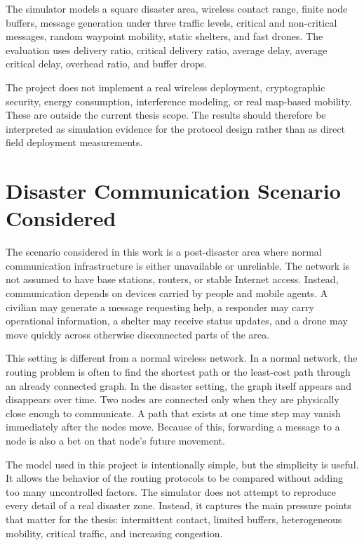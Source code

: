 The simulator models a square disaster area, wireless contact range, finite node buffers, message generation under three traffic levels, critical and non-critical messages, random waypoint mobility, static shelters, and fast drones. The evaluation uses delivery ratio, critical delivery ratio, average delay, average critical delay, overhead ratio, and buffer drops.

The project does not implement a real wireless deployment, cryptographic security, energy consumption, interference modeling, or real map-based mobility. These are outside the current thesis scope. The results should therefore be interpreted as simulation evidence for the protocol design rather than as direct field deployment measurements.

\section{Disaster Communication Scenario Considered}
The scenario considered in this work is a post-disaster area where normal communication infrastructure is either unavailable or unreliable. The network is not assumed to have base stations, routers, or stable Internet access. Instead, communication depends on devices carried by people and mobile agents. A civilian may generate a message requesting help, a responder may carry operational information, a shelter may receive status updates, and a drone may move quickly across otherwise disconnected parts of the area.

This setting is different from a normal wireless network. In a normal network, the routing problem is often to find the shortest path or the least-cost path through an already connected graph. In the disaster setting, the graph itself appears and disappears over time. Two nodes are connected only when they are physically close enough to communicate. A path that exists at one time step may vanish immediately after the nodes move. Because of this, forwarding a message to a node is also a bet on that node's future movement.

The model used in this project is intentionally simple, but the simplicity is useful. It allows the behavior of the routing protocols to be compared without adding too many uncontrolled factors. The simulator does not attempt to reproduce every detail of a real disaster zone. Instead, it captures the main pressure points that matter for the thesis: intermittent contact, limited buffers, heterogeneous mobility, critical traffic, and increasing congestion.

